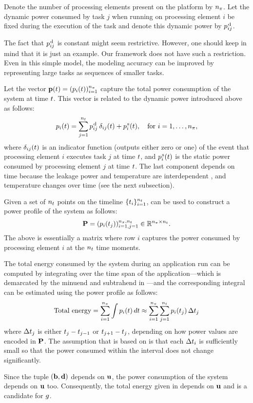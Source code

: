 Denote the number of processing elements present on the platform by ${n_\pi}$. Let
the dynamic power consumed by task $j$ when running on processing element $i$ be
fixed during the execution of the task and denote this dynamic power by
$p^{\text{\kern0.1emd}}_{ij}$.

\begin{remark}
The fact that $p^{\text{\kern0.1emd}}_{ij}$ is constant might seem restrictive. However,
one should keep in mind that it is just an example. Our framework does not have
such a restriction. Even in this simple model, the modeling accuracy can be
improved by representing large tasks as sequences of smaller tasks.
\end{remark}

Let the vector $\mathbf{p}(t) = (p_i(t))_{i = 1}^{{n_\pi}}$ capture the total power
consumption of the system at time $t$. This vector is related to the dynamic
power introduced above as follows:
\begin{equation} \elab{power}
  \p_i(\t) = \sum_{j = 1}^\nt \p^\dynamic_{ij} \: \delta_{ij} (\t) + \p^\static_i(\t), \hspace{1em} \text{for $i = 1, \dots, \np$},
\end{equation}
where $\delta_{ij}(t)$ is an indicator function (outputs either zero or one) of
the event that processing element $i$ executes task $j$ at time $t$, and
$p^{\text{\kern0.1ems}}_i(t)$ is the static power consumed by processing element $j$ at
time $t$. The last component depends on time because the leakage power and
temperature are interdependent \cite{liu2007}, and temperature changes over time
(see the next subsection).

Given a set of ${n_t}$ points on the timeline $\{ t_i \}_{i = 1}^{n_t}$,
 can be used to construct a power profile of the system as follows:
\[
  \mathbf{P} = (p_i(t_j))_{i = 1, j = 1}^{{n_\pi}, {n_t}} \in \mathbb{R}^{{n_\pi} \times {n_t}}.
\]
The above is essentially a matrix where row $i$ captures the power consumed by
processing element $i$ at the ${n_t}$ time moments.

The total energy consumed by the system during an application run can be
computed by integrating  over the time span of the
application---which is demarcated by the minuend and subtrahend in
---and the corresponding integral can be estimated using
the power profile as follows:
\begin{equation} \elab{total-energy}
  \text{Total energy} = \sum_{i = 1}^\np \int \p_i(\t) \, \d\t \approx \sum_{i = 1}^\np \sum_{j = 1}^\ns \p_i(\t_j) \, \Delta\t_j
\end{equation}
where $\Delta t_j$ is either $t_j - t_{j - 1}$ or $t_{j + 1} - t_j$,
depending on how power values are encoded in $\mathbf{P}$. The assumption that
 is based on is that each $\Delta t_i$ is sufficiently small
so that the power consumed within the interval does not change significantly.

Since the tuple $(\mathbf{b}, \mathbf{d})$ depends on $\mathbf{u}$, the power consumption of the
system depends on $\mathbf{u}$ too. Consequently, the total energy given in
 depends on $\mathbf{u}$ and is a candidate for $g$.
